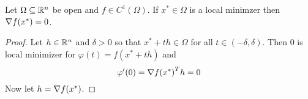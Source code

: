 \begin{theorem}\label{thm:fonc}
Let \( \Omega \subseteq \mathbb{R}^n \) be open and \( f \in C^1(\Omega) \). If \( x^* \in \Omega \) is a local minimzer then
\( \nabla f(x^*) = 0 \).
\end{theorem}

\begin{proof}
Let \( h \in \mathbb{R}^n \) and \( \delta > 0 \) so that \( x^* + th \in \Omega \) for all \( t \in (-\delta, \delta) \). 
Then \( 0 \) is local minimizer for \( \varphi(t) = f(x^* + th) \) and
\[
    \varphi^\prime(0) = {\nabla f(x^*)}^T h = 0
\]
Now let \( h = \nabla f(x^*) \). 
\end{proof}
\bigskip
